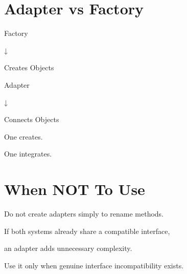 \documentclass[11pt,a4paper]{book}
\begin{document}

\section{Adapter vs Factory}

\begin{mentalmodel}

Factory

↓

Creates Objects

\vspace{0.5em}

Adapter

↓

Connects Objects

\end{mentalmodel}


One creates.


One integrates.


\section{When NOT To Use}

\begin{trap}

Do not create adapters simply
to rename methods.


If both systems already share
a compatible interface,

an adapter adds unnecessary
complexity.


Use it only when genuine
interface incompatibility
exists.

\end{trap}

\end{document}
